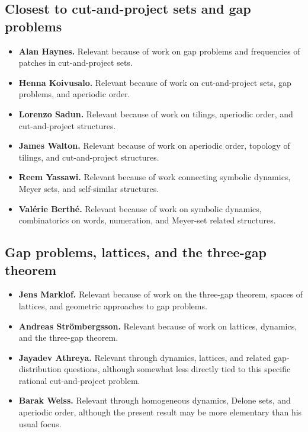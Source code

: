 \documentclass[11pt]{article}
\begin{document}
\subsection*{Closest to cut-and-project sets and gap problems}

\begin{itemize}
    \item \textbf{Alan Haynes.}  Relevant because of work on gap problems and
    frequencies of patches in cut-and-project sets.

    \item \textbf{Henna Koivusalo.}  Relevant because of work on
    cut-and-project sets, gap problems, and aperiodic order.

    \item \textbf{Lorenzo Sadun.}  Relevant because of work on tilings,
    aperiodic order, and cut-and-project structures.

    \item \textbf{James Walton.}  Relevant because of work on aperiodic order,
    topology of tilings, and cut-and-project structures.

    \item \textbf{Reem Yassawi.}  Relevant because of work connecting symbolic
    dynamics, Meyer sets, and self-similar structures.

    \item \textbf{Val\'{e}rie Berth\'{e}.}  Relevant because of work on
    symbolic dynamics, combinatorics on words, numeration, and Meyer-set
    related structures.
\end{itemize}

\subsection*{Gap problems, lattices, and the three-gap theorem}

\begin{itemize}
    \item \textbf{Jens Marklof.}  Relevant because of work on the three-gap
    theorem, spaces of lattices, and geometric approaches to gap problems.

    \item \textbf{Andreas Str\"ombergsson.}  Relevant because of work on
    lattices, dynamics, and the three-gap theorem.

    \item \textbf{Jayadev Athreya.}  Relevant through dynamics, lattices, and
    related gap-distribution questions, although somewhat less directly tied
    to this specific rational cut-and-project problem.

    \item \textbf{Barak Weiss.}  Relevant through homogeneous dynamics,
    Delone sets, and aperiodic order, although the present result may be more
    elementary than his usual focus.
\end{itemize}
\end{document}
